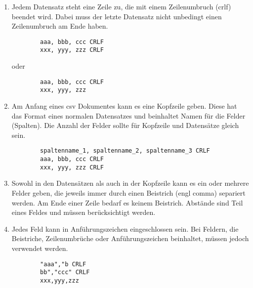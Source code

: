 \begin{enumerate}{}
	
	\item Jedem Datensatz steht eine Zeile zu, die mit einem Zeilenumbruch (\ac{crlf}) beendet wird. Dabei muss der letzte Datensatz nicht unbedingt einen Zeilenumbruch am Ende haben. \zB 
	\begin{lstlisting}
		aaa, bbb, ccc CRLF
		xxx, yyy, zzz CRLF
	\end{lstlisting}
	oder
	\begin{lstlisting}
		aaa, bbb, ccc CRLF
		xxx, yyy, zzz
	\end{lstlisting}
	
	\item Am Anfang eines \acs{csv} Dokumentes kann es eine Kopfzeile geben. Diese hat das Format eines normalen Datensatzes und beinhaltet Namen für die Felder (Spalten). Die Anzahl der Felder sollte für Kopfzeile und Datensätze gleich sein. \zB
	\begin{lstlisting}
		spaltenname_1, spaltenname_2, spaltenname_3 CRLF
		aaa, bbb, ccc CRLF
		xxx, yyy, zzz CRLF
	\end{lstlisting}
	
	\item Sowohl in den Datensätzen als auch in der Kopfzeile kann es ein oder mehrere Felder geben, die jeweils immer durch einen Beistrich (\acs{engl} comma) separiert werden. Am Ende einer Zeile bedarf es keinem Beistrich. Abstände sind Teil eines Feldes und müssen berücksichtigt werden.
	
	\item Jedes Feld kann in Anführungszeichen eingeschlossen sein. Bei Feldern, die Beistriche, Zeilenumbrüche oder Anführungszeichen beinhaltet, müssen jedoch verwendet werden. \zB
	\begin{lstlisting}
		"aaa","b CRLF
		bb","ccc" CRLF
		xxx,yyy,zzz
	\end{lstlisting}
	
\end{enumerate}



